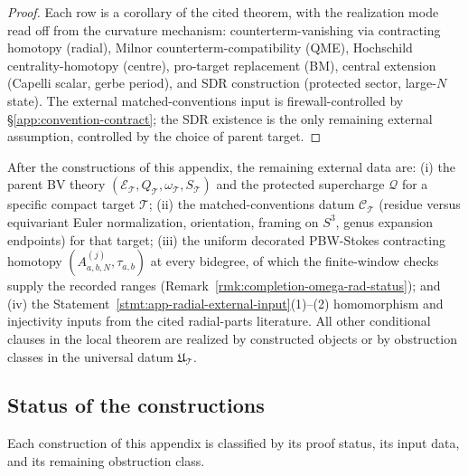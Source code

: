 \begin{proof}
Each row is a corollary of the cited theorem, with the realization
mode read off from the curvature mechanism: counterterm-vanishing
via contracting homotopy (radial), Milnor counterterm-compatibility
(QME), Hochschild centrality-homotopy (centre), pro-target replacement
(BM), central extension (Capelli scalar, gerbe period), and SDR
construction (protected sector, large-\(N\) state).  The external
matched-conventions input is firewall-controlled by
\S\ref{app:convention-contract}; the SDR existence is the only
remaining external assumption, controlled by the choice of
parent target.
\end{proof}

\begin{rmk}
\label{rmk:completion-what-remains-external}
After the constructions of this appendix, the remaining external data are:
(i) the parent BV theory
\((\mathcal E_{\mathcal T},Q_{\mathcal T},\omega_{\mathcal T},
S_{\mathcal T})\) and the protected supercharge \(\mathcal Q\) for
a specific compact target \(\mathcal T\); (ii) the
matched-conventions datum \(\mathcal C_{\mathcal T}\) (residue
versus equivariant Euler normalization, orientation, framing on
\(S^3\), genus expansion endpoints) for that target;
(iii) the uniform decorated PBW-Stokes contracting homotopy
\((A^{(j)}_{a,b,N},\tau_{a,b})\) at every bidegree, of which the
finite-window checks supply the recorded ranges
(Remark~\ref{rmk:completion-omega-rad-status}); and (iv) the
Statement~\ref{stmt:app-radial-external-input}(1)--(2)
homomorphism and injectivity inputs from the cited radial-parts
literature.  All other conditional clauses in the local theorem are
realized by constructed objects or by obstruction classes in the
universal datum \(\mathfrak U_{\mathcal T}\).
\end{rmk}

\subsection{Status of the constructions}
\label{ssec:completion-construction-status}

Each construction of this appendix is classified by its proof status,
its input data, and its remaining obstruction class.

